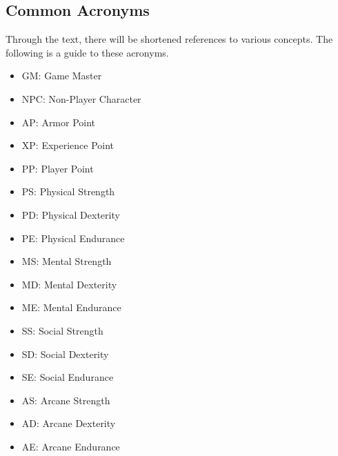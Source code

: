 \begin{multicols}{2}
\section{Common Acronyms}

Through the text, there will be shortened references to various concepts.
The following is a guide to these acronyms.

\begin{itemize}
    \item GM: Game Master
    \item NPC: Non-Player Character
    \item AP: Armor Point
    \item XP: Experience Point
    \item PP: Player Point
    \item PS: Physical Strength
    \item PD: Physical Dexterity
    \item PE: Physical Endurance
    \item MS: Mental Strength
    \item MD: Mental Dexterity
    \item ME: Mental Endurance
    \item SS: Social Strength
    \item SD: Social Dexterity
    \item SE: Social Endurance
    \item AS: Arcane Strength
    \item AD: Arcane Dexterity
    \item AE: Arcane Endurance
\end{itemize}

\end{multicols}
